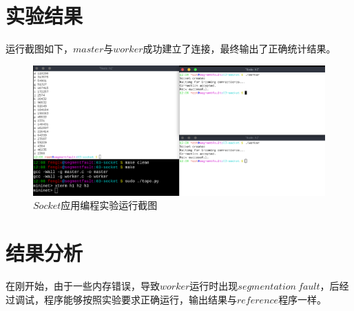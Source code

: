 \documentclass[UTF8,noindent]{ctexart}
\begin{document}
\section*{{实验结果}}运行截图如下，$master$与$worker$成功建立了连接，最终输出了正确统计结果。\\
			\begin{figure}[H]
			\centering
			\includegraphics[scale = 0.3]{./sshot.png}
			\caption{$Socket$应用编程实验运行截图}
			\end{figure}
		\section*{{结果分析}}在刚开始，由于一些内存错误，导致$worker$运行时出现$segmentation\ fault$，后经过调试，程序能够按照实验要求正确运行，输出结果与$reference$程序一样。\\
			
\end{document}
